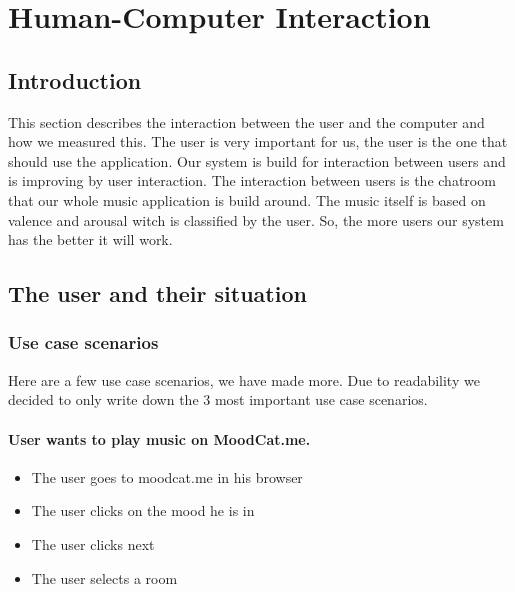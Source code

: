 \chapter{Human-Computer Interaction}

\section{Introduction}
This section describes the interaction between the user and the computer and how we measured this.
The user is very important for us, the user is the one that should use the application.
Our system is build for interaction between users and is improving by user interaction.
The interaction between users is the chatroom that our whole music application is build around.
The music itself is based on valence and arousal witch is classified by the user.
So, the more users our system has the better it will work.




\section{The user and their situation}

\subsection{Use case scenarios}
Here are a few use case scenarios, we have made more.
Due to readability we decided to only write down the 3 most important use case scenarios.

\subsubsection{User wants to play music on MoodCat.me.}
\begin{itemize}
\item The user goes to moodcat.me in his browser
\item The user clicks on the mood he is in
\item The user clicks next
\item The user selects a room
\end{itemize}

